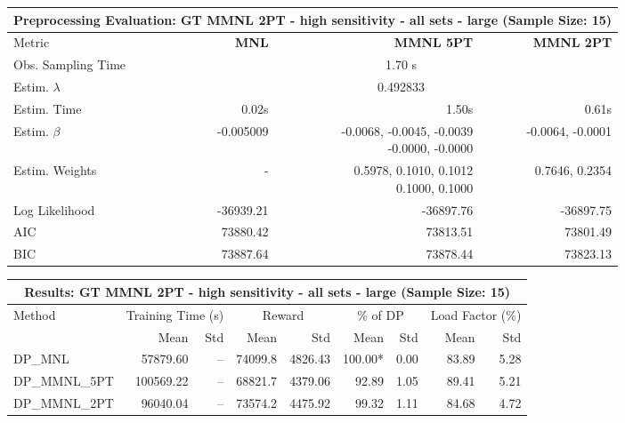 
\begin{samepage}
\begin{center}
  \small
  \begin{tabular}{l|r|r|r}
    \toprule
    \multicolumn{4}{c}{\textbf{Preprocessing Evaluation: GT MMNL 2PT - high sensitivity - all sets - large (Sample Size: 15)}} \\
    \midrule
    Metric & \textbf{MNL} & \textbf{MMNL 5PT} & \textbf{MMNL 2PT} \\
    \midrule
    Obs. Sampling Time & \multicolumn{3}{c}{1.70 s} \\
    Estim. $\lambda$ & \multicolumn{3}{c}{0.492833} \\
    Estim. Time & 0.02s & 1.50s & 0.61s \\
    Estim. $\beta$ & -0.005009 & \makecell[tr]{-0.0068, -0.0045, -0.0039 \\ -0.0000, -0.0000} & -0.0064, -0.0001 \\
    Estim. Weights & - & \makecell[tr]{0.5978, 0.1010, 0.1012 \\ 0.1000, 0.1000} & 0.7646, 0.2354 \\
    Log Likelihood & -36939.21 & -36897.76 & -36897.75 \\
    AIC & 73880.42 & 73813.51 & 73801.49 \\
    BIC & 73887.64 & 73878.44 & 73823.13 \\
    \bottomrule
  \end{tabular}
\end{center}
\begin{center}
  \small
  \begin{tabular}{l|rr|rr|rr|rr}
    \toprule
    \multicolumn{9}{c}{\textbf{Results: GT MMNL 2PT - high sensitivity - all sets - large (Sample Size: 15)}} \\
    \midrule
    Method & \multicolumn{2}{c|}{Training Time (s)} & \multicolumn{2}{c|}{Reward} & \multicolumn{2}{c|}{\% of DP} & \multicolumn{2}{c}{Load Factor (\%)} \\
    & Mean & Std & Mean & Std & Mean & Std & Mean & Std \\
    \midrule
    DP\_MNL      & 57879.60 &    -- &    74099.8 &    4826.43 & 100.00* &    0.00 &   83.89 &    5.28 \\
    DP\_MMNL\_5PT & 100569.22 &    -- &    68821.7 &    4379.06 &   92.89 &    1.05 &   89.41 &    5.21 \\
    DP\_MMNL\_2PT & 96040.04 &    -- &    73574.2 &    4475.92 &   99.32 &    1.11 &   84.68 &    4.72 \\

\end{tabular}
\end{center}
\end{samepage}
